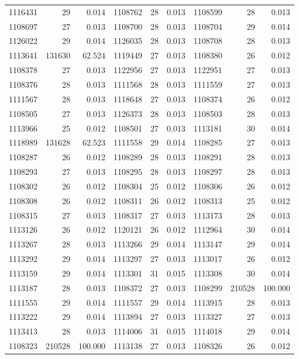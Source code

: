 \documentclass[11pt,a4paper]{article}
\begin{document}
\begin{longtable}{rrr|rrr|rrr}
1116431 & 29 & 0.014 & 1108762 & 28 & 0.013 & 1108599 & 28 & 0.013\\
1108697 & 27 & 0.013 & 1108700 & 28 & 0.013 & 1108704 & 29 & 0.014\\
1126022 & 29 & 0.014 & 1126035 & 28 & 0.013 & 1108708 & 28 & 0.013\\
1113641 & 131630 & 62.524 & 1119449 & 27 & 0.013 & 1108380 & 26 & 0.012\\
1108378 & 27 & 0.013 & 1122956 & 27 & 0.013 & 1122951 & 27 & 0.013\\
1108376 & 28 & 0.013 & 1111568 & 28 & 0.013 & 1111559 & 27 & 0.013\\
1111567 & 28 & 0.013 & 1118648 & 27 & 0.013 & 1108374 & 26 & 0.012\\
1108505 & 27 & 0.013 & 1126373 & 28 & 0.013 & 1108503 & 28 & 0.013\\
1113966 & 25 & 0.012 & 1108501 & 27 & 0.013 & 1113181 & 30 & 0.014\\
1118989 & 131628 & 62.523 & 1111558 & 29 & 0.014 & 1108285 & 27 & 0.013\\
1108287 & 26 & 0.012 & 1108289 & 28 & 0.013 & 1108291 & 28 & 0.013\\
1108293 & 27 & 0.013 & 1108295 & 28 & 0.013 & 1108297 & 28 & 0.013\\
1108302 & 26 & 0.012 & 1108304 & 25 & 0.012 & 1108306 & 26 & 0.012\\
1108308 & 26 & 0.012 & 1108311 & 26 & 0.012 & 1108313 & 25 & 0.012\\
1108315 & 27 & 0.013 & 1108317 & 27 & 0.013 & 1113173 & 28 & 0.013\\
1113126 & 26 & 0.012 & 1120121 & 26 & 0.012 & 1112964 & 30 & 0.014\\
1113267 & 28 & 0.013 & 1113266 & 29 & 0.014 & 1113147 & 29 & 0.014\\
1113292 & 29 & 0.014 & 1113297 & 27 & 0.013 & 1113017 & 26 & 0.012\\
1113159 & 29 & 0.014 & 1113301 & 31 & 0.015 & 1113308 & 30 & 0.014\\
1113187 & 28 & 0.013 & 1108372 & 27 & 0.013 & 1108299 & 210528 & 100.000\\
1111555 & 29 & 0.014 & 1111557 & 29 & 0.014 & 1113915 & 28 & 0.013\\
1113222 & 29 & 0.014 & 1113894 & 27 & 0.013 & 1113327 & 27 & 0.013\\
1113413 & 28 & 0.013 & 1114006 & 31 & 0.015 & 1114018 & 29 & 0.014\\
1108323 & 210528 & 100.000 & 1113138 & 27 & 0.013 & 1108326 & 26 & 0.012\\

\end{longtable}
\end{document}
